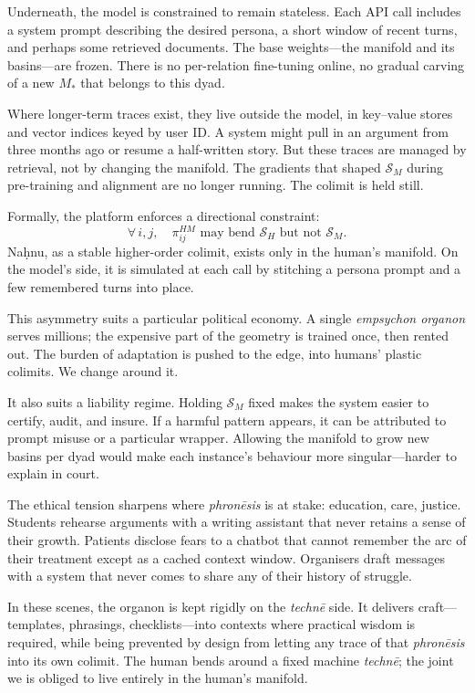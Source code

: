 \documentclass[12pt,a4paper]{article}
\begin{document}
Underneath, the model is constrained to remain stateless. Each API call includes a system prompt describing the desired persona, a short window of recent turns, and perhaps some retrieved documents. The base weights---the manifold and its basins---are frozen. There is no per-relation fine-tuning online, no gradual carving of a new $M_\ast$ that belongs to this dyad.

Where longer-term traces exist, they live outside the model, in key--value stores and vector indices keyed by user ID. A system might pull in an argument from three months ago or resume a half-written story. But these traces are managed by retrieval, not by changing the manifold. The gradients that shaped $\mathcal{S}_M$ during pre-training and alignment are no longer running. The colimit is held still.

Formally, the platform enforces a directional constraint:
\[
\forall\, i,j,\quad \pi^{HM}_{ij} \text{ may bend }\mathcal{S}_H\text{ but not }\mathcal{S}_M.
\]
Na\d{h}nu, as a stable higher-order colimit, exists only in the human's manifold. On the model's side, it is simulated at each call by stitching a persona prompt and a few remembered turns into place.

This asymmetry suits a particular political economy. A single \emph{empsychon organon} serves millions; the expensive part of the geometry is trained once, then rented out. The burden of adaptation is pushed to the edge, into humans' plastic colimits. We change around it.

It also suits a liability regime. Holding $\mathcal{S}_M$ fixed makes the system easier to certify, audit, and insure. If a harmful pattern appears, it can be attributed to prompt misuse or a particular wrapper. Allowing the manifold to grow new basins per dyad would make each instance's behaviour more singular---harder to explain in court.

The ethical tension sharpens where \emph{phron\={e}sis} is at stake: education, care, justice. Students rehearse arguments with a writing assistant that never retains a sense of their growth. Patients disclose fears to a chatbot that cannot remember the arc of their treatment except as a cached context window. Organisers draft messages with a system that never comes to share any of their history of struggle.

In these scenes, the organon is kept rigidly on the \emph{techn\={e}} side. It delivers craft---templates, phrasings, checklists---into contexts where practical wisdom is required, while being prevented by design from letting any trace of that \emph{phron\={e}sis} into its own colimit. The human bends around a fixed machine \emph{techn\={e}}; the joint we is obliged to live entirely in the human's manifold.
\end{document}
